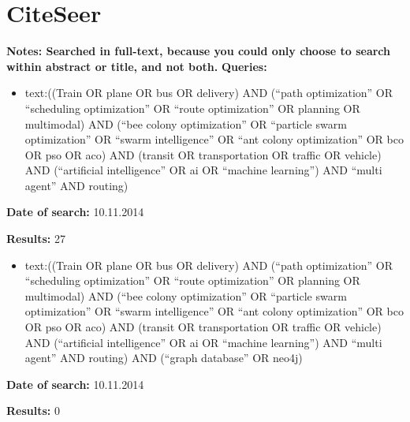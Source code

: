 \section{CiteSeer}
\textbf{Notes: Searched in full-text, because you could only choose to search within abstract or title, and not both.}
\newline
\newline
\textbf{Queries:}
\begin{itemize}
\item text:((Train OR plane OR bus OR delivery) AND (``path optimization'' OR ``scheduling optimization'' OR ``route optimization'' OR planning OR multimodal) AND (``bee colony optimization'' OR ``particle swarm optimization'' OR ``swarm intelligence'' OR ``ant colony optimization'' OR bco OR pso OR aco) AND (transit OR transportation OR traffic OR vehicle) AND (``artificial intelligence'' OR ai OR ``machine learning'') AND ``multi agent'' AND routing)
\end{itemize}
\par \textbf{Date of search:} 10.11.2014
\par \textbf{Results:} 27
\begin{itemize}
\item text:((Train OR plane OR bus OR delivery) AND (``path optimization'' OR ``scheduling optimization'' OR ``route optimization'' OR planning OR multimodal) AND (``bee colony optimization'' OR ``particle swarm optimization'' OR ``swarm intelligence'' OR ``ant colony optimization'' OR bco OR pso OR aco) AND (transit OR transportation OR traffic OR vehicle) AND (``artificial intelligence'' OR ai OR ``machine learning'') AND ``multi agent'' AND routing) AND (``graph database'' OR neo4j)
\end{itemize}
\par \textbf{Date of search:} 10.11.2014
\par \textbf{Results:} 0
 

